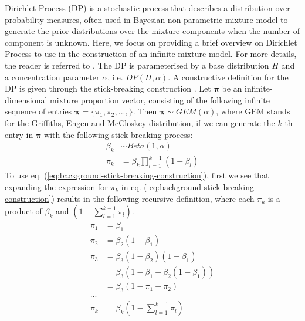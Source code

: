 Dirichlet Process (DP) \cite{ferguson1973bayesian} is a stochastic process that describes a distribution over probability measures, often used in Bayesian non-parametric mixture model to generate the prior distributions over the mixture components when the number of component is unknown. Here, we focus on providing a brief overview on Dirichlet Process to use in the construction of an infinite mixture model. For more details, the reader is referred to \cite{murphy2012machine, Rasmussen2000, hjort2010bayesian,teh2011dirichlet}. The DP is parameterised by a base distribution $H$ and a concentration parameter $\alpha$, i.e. $DP(H, \alpha)$. A constructive definition for the DP is given through the stick-breaking construction \cite{ishwaran2011gibbs}. Let $\boldsymbol{\pi}$ be an infinite-dimensional mixture proportion vector, consisting of the following infinite sequence of entries $\boldsymbol{\pi}=\{\pi_1, \pi_2, ..., \}$. Then $\boldsymbol{\pi} \sim GEM(\alpha)$, where GEM stands for the Griffiths, Engen and McCloskey distribution, if we can generate the $k$-th entry in $\boldsymbol{\pi}$ with the following stick-breaking process:
\begin{equation}
\begin{aligned}
\beta_k &\sim Beta(1, \alpha) \\
\pi_k     &= \beta_k \prod_{l=1}^{k-1} (1-\beta_l) 
\end{aligned}
\label{eq:background-stick-breaking-construction}
\end{equation}
To use eq. (\ref{eq:background-stick-breaking-construction}), first we see that expanding the expression for $\pi_k$ in eq. (\ref{eq:background-stick-breaking-construction}) results in the following recursive definition, where each $\pi_k$ is a product of $\beta_k$ and $(1-\sum_{l=1}^{k-1} \pi_l)$.
\begin{equation}
\begin{aligned}
\pi_1 &= \beta_1 \\
\pi_2 &= \beta_2(1-\beta_1) \\
\pi_3 &= \beta_3(1-\beta_2)(1-\beta_1) \\
         &= \beta_3(1-\beta_1-\beta_2(1-\beta_1)) \\
         &= \beta_3(1-\pi_1-\pi_2) \\
... \\
\pi_k &= \beta_k(1-\sum_{l=1}^{k-1} \pi_l)
\end{aligned}
\label{eq:background-pi-gem}
\end{equation}
